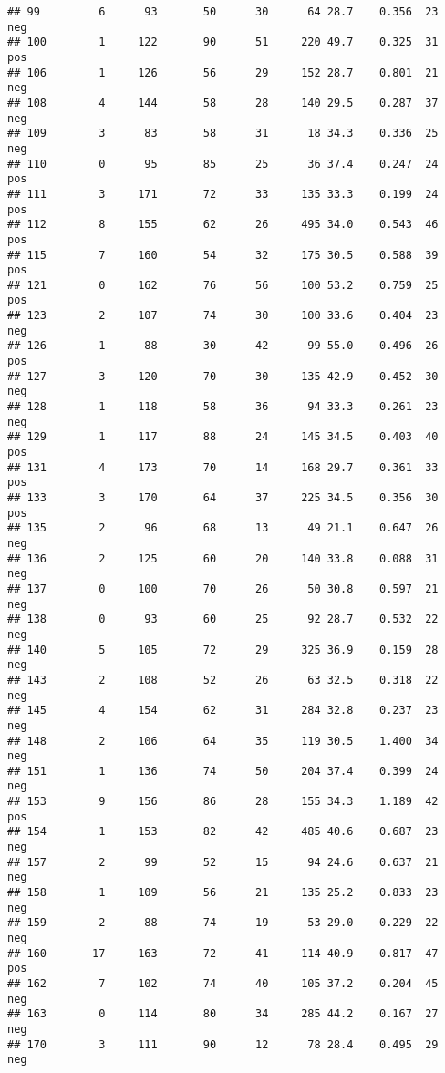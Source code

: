 \documentclass[
]{article}
\begin{document}
\begin{verbatim}
## 99         6      93       50      30      64 28.7    0.356  23      neg
## 100        1     122       90      51     220 49.7    0.325  31      pos
## 106        1     126       56      29     152 28.7    0.801  21      neg
## 108        4     144       58      28     140 29.5    0.287  37      neg
## 109        3      83       58      31      18 34.3    0.336  25      neg
## 110        0      95       85      25      36 37.4    0.247  24      pos
## 111        3     171       72      33     135 33.3    0.199  24      pos
## 112        8     155       62      26     495 34.0    0.543  46      pos
## 115        7     160       54      32     175 30.5    0.588  39      pos
## 121        0     162       76      56     100 53.2    0.759  25      pos
## 123        2     107       74      30     100 33.6    0.404  23      neg
## 126        1      88       30      42      99 55.0    0.496  26      pos
## 127        3     120       70      30     135 42.9    0.452  30      neg
## 128        1     118       58      36      94 33.3    0.261  23      neg
## 129        1     117       88      24     145 34.5    0.403  40      pos
## 131        4     173       70      14     168 29.7    0.361  33      pos
## 133        3     170       64      37     225 34.5    0.356  30      pos
## 135        2      96       68      13      49 21.1    0.647  26      neg
## 136        2     125       60      20     140 33.8    0.088  31      neg
## 137        0     100       70      26      50 30.8    0.597  21      neg
## 138        0      93       60      25      92 28.7    0.532  22      neg
## 140        5     105       72      29     325 36.9    0.159  28      neg
## 143        2     108       52      26      63 32.5    0.318  22      neg
## 145        4     154       62      31     284 32.8    0.237  23      neg
## 148        2     106       64      35     119 30.5    1.400  34      neg
## 151        1     136       74      50     204 37.4    0.399  24      neg
## 153        9     156       86      28     155 34.3    1.189  42      pos
## 154        1     153       82      42     485 40.6    0.687  23      neg
## 157        2      99       52      15      94 24.6    0.637  21      neg
## 158        1     109       56      21     135 25.2    0.833  23      neg
## 159        2      88       74      19      53 29.0    0.229  22      neg
## 160       17     163       72      41     114 40.9    0.817  47      pos
## 162        7     102       74      40     105 37.2    0.204  45      neg
## 163        0     114       80      34     285 44.2    0.167  27      neg
## 170        3     111       90      12      78 28.4    0.495  29      neg

\end{verbatim}
\end{document}
